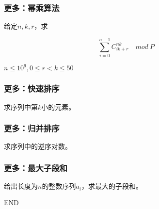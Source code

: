 \documentclass{ctexbeamer}
\begin{document}
    \begin{frame}
        \frametitle{更多：幂乘算法}

        给定$n,k,r$，求

        $$
        \sum_{i=0}^{n-1}{C_{ik+r}^{nk}} \quad mod \ P
        $$

        $n\leq 10^9,0\leq r < k \leq 50$

    \end{frame}

    \begin{frame}
        \frametitle{更多：快速排序}

        求序列中第$k$小的元素。

    \end{frame}

    \begin{frame}
        \frametitle{更多：归并排序}

        求序列中的逆序对数。

    \end{frame}

    \begin{frame}
        \frametitle{更多：最大子段和}

        给出长度为$n$的整数序列$a_i$，求最大的子段和。

    \end{frame}

    \begin{frame}
        END
    \end{frame}
    
\end{document}
